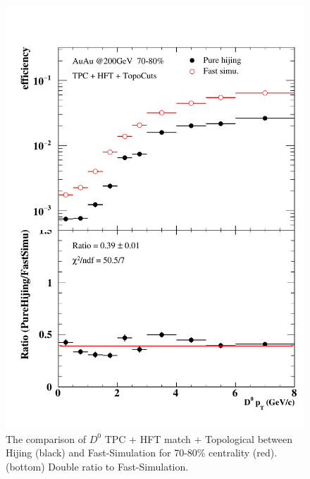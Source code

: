 \begin{figure}[htbp]
\begin{minipage}[htbp]{0.47\linewidth}
\centering
\includegraphics[width=1.0\textwidth,angle=0]{figure/Run14_D0HFT/70_80.pdf}
\caption{ The comparison of $D^0$ TPC + HFT match + Topological between Hijing (black) and Fast-Simulation for 70-80\% centrality (red). (bottom) Double ratio to Fast-Simulation.\label{70_80}}
\end{minipage}
\hfill
\begin{minipage}[htbp]{0.47\linewidth}
\centering

\end{minipage}
\end{figure}
